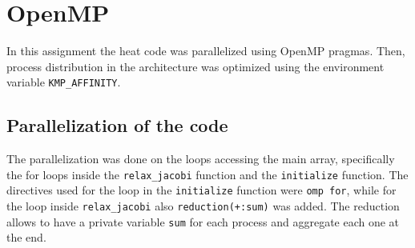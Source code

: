 \chapter{OpenMP}

In this assignment the heat code was parallelized using OpenMP pragmas. Then, process distribution in the architecture was optimized using the environment variable \verb|KMP_AFFINITY|.




\section*{Parallelization of the code}

The parallelization was done on the loops accessing the main array, specifically the for loops inside the 
 \verb|relax_jacobi| function and the \verb|initialize| function. The directives used for the loop in the \verb|initialize| function were \verb|omp for|, while for the loop inside \verb|relax_jacobi| also \verb|reduction(+:sum)| was added. The reduction allows to have a private variable \verb|sum| for each process and aggregate each one at the end.

